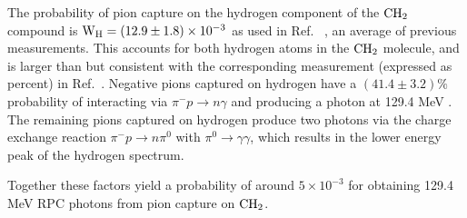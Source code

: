 The probability of pion capture on the hydrogen component of the $\rm{CH_2}$ compound is
$\newline \rm{ W_H = (12.9 \pm 1.8) \times 10^{-3 }}$
 as used in Ref.~\cite{RPC_1991_Harston_PhysRevA.44.103}
 , an average of previous measurements. 
 This accounts for both hydrogen atoms in the $\rm{CH_2}$ molecule, and is larger than but consistent with the
 corresponding measurement (expressed as percent) in Ref.~\cite{RPC_1972_Bistirlich_PhysRevC.5.1867}.
 Negative pions captured on hydrogen have a $ (41.4 \pm 3.2) \% $
 probability of interacting via $\pi^{-} p \to n \gamma$ and producing a photon at 129.4 MeV
 \cite{RPC_1972_Bistirlich_PhysRevC.5.1867}.
 The remaining pions captured on hydrogen produce two photons via the charge exchange reaction
 $ \pi^{-} p \to n \pi^0 $ with $\pi^0  \to \gamma \gamma $,
 which results in the lower energy peak of the hydrogen spectrum. 

Together these factors yield a probability of around $ 5 \times 10^{-3} $
for obtaining 129.4 MeV RPC photons from pion capture on $\rm{CH_2}$.



